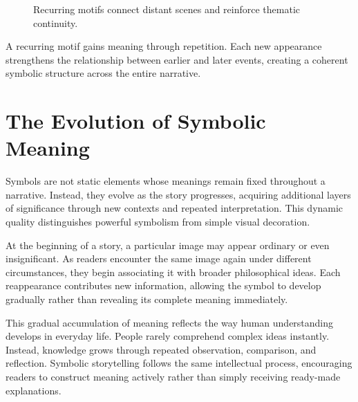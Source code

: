 \documentclass[12pt,oneside,openany]{book}
\begin{document}
\begin{figure}[H]
\centering
{}

\caption{Recurring motifs connect distant scenes and reinforce thematic continuity.}
\end{figure}

\begin{tcolorbox}[colback=blue!5,colframe=blue!60!black,title=Analysis]
A recurring motif gains meaning through repetition. Each new appearance
strengthens the relationship between earlier and later events, creating a
coherent symbolic structure across the entire narrative.
\end{tcolorbox}
\section{The Evolution of Symbolic Meaning}

Symbols are not static elements whose meanings remain fixed throughout a
narrative. Instead, they evolve as the story progresses, acquiring additional
layers of significance through new contexts and repeated interpretation. This
dynamic quality distinguishes powerful symbolism from simple visual decoration.

At the beginning of a story, a particular image may appear ordinary or even
insignificant. As readers encounter the same image again under different
circumstances, they begin associating it with broader philosophical ideas. Each
reappearance contributes new information, allowing the symbol to develop
gradually rather than revealing its complete meaning immediately.

This gradual accumulation of meaning reflects the way human understanding
develops in everyday life. People rarely comprehend complex ideas instantly.
Instead, knowledge grows through repeated observation, comparison, and
reflection. Symbolic storytelling follows the same intellectual process,
encouraging readers to construct meaning actively rather than simply receiving
ready-made explanations.
\end{document}
